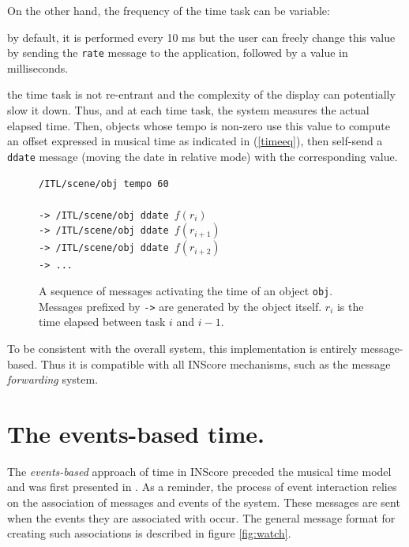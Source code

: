 \documentclass{article}
\newcommand{\OSC}[1]	{{\fontsize{8.5pt}{8pt} \selectfont\texttt{#1}}}
\let\olditemize\itemize
\let\oldenditemize\enditemize
\renewenvironment{itemize} 	{\olditemize \renewcommand{\labelitemi}{$\bullet$} \setlength{\itemsep}{0mm}}{\oldenditemize}
\newcommand{\sample}[1]		{\vspace{-0.2em}\begin{center}\colorbox{mygrey}{\begin{minipage}[t]{0.98\columnwidth} {\small \texttt{#1}}\end{minipage}}\end{center}}
\begin{document}
On the other hand, the frequency of the time task can be variable:
\begin{itemize}
\item by default, it is performed every 10 ms but the user can freely change this value by sending the \OSC{rate} message to the application, followed by a value in milliseconds.
\item the time task is not re-entrant and the complexity of the display can potentially slow it down.
\end{itemize}
Thus, and at each time task, the system measures the actual elapsed time. Then, objects whose tempo is non-zero use this value to compute an offset expressed in musical time as indicated in (\ref{timeeq}), then self-send a \OSC{ddate} message (moving the date in relative mode) with the corresponding value.

\begin{figure}[h]
   \centering
   \sample{/ITL/scene/obj tempo 60 \\
   \\
-> /ITL/scene/obj ddate $f(r_i)$ \\
-> /ITL/scene/obj ddate $f(r_{i+1})$ \\
-> /ITL/scene/obj ddate $f(r_{i+2})$ \\
-> ...
}
   \caption{A sequence of messages activating the time of an object \OSC{obj}. Messages prefixed by \OSC{->} are generated by the object itself. $r_{i}$ is the time elapsed between task $i$ and $i-1$.}
   \label{fig:tempo}
\end{figure}

To be consistent with the overall system, this implementation is entirely message-based. Thus it is compatible with all INScore mechanisms, such as the message \emph{forwarding} system.

\section{The events-based time.}\label{evtime}

The \emph{events-based} approach of time in INScore preceded the musical time model and was first presented in \cite{Fober:13b}. As a reminder, the process of event interaction relies on the association of messages and events of the system. These messages are sent when the events they are associated with occur. The general message format for creating such associations is described in figure \ref{fig:watch}.
\end{document}
